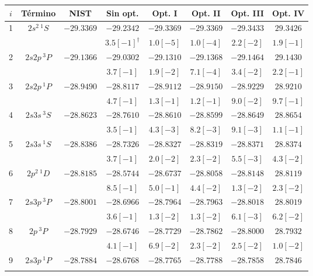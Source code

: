 \begin{table}
\centering
\begin{tabular}{|*{8}{c|}}
\hline 
$i$ & Término & NIST 
  & Sin opt.    & Opt. I     & Opt. II    & Opt. III   & Opt. IV \\
\hline \hline 
\rowcolor{mygray} 
1 & $2s^2\,^1S$ & $-29.3369$ 
  & $-29.2342$  & $-29.3369$ & $-29.3369$ & $-29.3433$ & $29.3426$ \\ & & 
  & $3.5[-1]^\dagger$ & $1.0[-5]$ & $1.0[-4]$ & $2.2[-2]$ & $1.9[-1]$ \\ 
\rowcolor{mygray} 
2 & $2s2p\,^3P$ & $-29.1366$ 
  & $-29.0302$  & $-29.1310$ & $-29.1368$ & $-29.1464$ & $29.1430$ \\ & & 
  & $3.7[-1]$   & $1.9[-2]$  & $7.1[-4]$  & $3.4[-2]$  & $2.2[-1]$ \\ 
\rowcolor{mygray} 
3 & $2s2p\,^1P$ & $-28.9490$ 
  & $-28.8117$  & $-28.9112$ & $-28.9150$ & $-28.9229$ & $28.9210$ \\ & & 
  & $4.7[-1]$   & $1.3[-1]$  & $1.2[-1]$  & $9.0[-2]$  & $9.7[-1]$ \\ 
\rowcolor{mygray}
4 & $2s3s\,^3S$ & $-28.8623$ 
  & $-28.7610$  & $-28.8610$ & $-28.8599$ & $-28.8649$ & $28.8654$ \\ & & 
  & $3.5[-1]$   & $4.3[-3]$  & $8.2[-3]$  & $9.1[-3]$  & $1.1[-1]$ \\ 
\rowcolor{mygray} 
5 & $2s3s\,^1S$ & $-28.8386$ 
  & $-28.7326$  & $-28.8327$ & $-28.8319$ & $-28.8371$ & $28.8374$ \\ & & 
  & $3.7[-1]$   & $2.0[-2]$  & $2.3[-2]$  & $5.5[-3]$  & $4.3[-2]$ \\ 
\rowcolor{mygray} 
6 & $2p^2\,^1D$ & $-28.8185$
  & $-28.5744$  & $-28.6737$ & $-28.8058$ & $-28.8148$ & $28.8119$ \\ & & 
  & $8.5[-1]$   & $5.0[-1]$  & $4.4[-2]$  & $1.3[-2]$  & $2.3[-2]$\\ 
\rowcolor{mygray} 
7 & $2s3p\,^3P$ & $-28.8001$ 
  & $-28.6966$  & $-28.7964$ & $-28.7963$ & $-28.8018$ & $28.8019$ \\ & & 
  & $3.6[-1]$   & $1.3[-2]$  & $1.3[-2]$  & $6.1[-3]$  & $6.2[-2]$ \\  
\rowcolor{mygray} 
8 & $2p\,^3P$   & $-28.7929$ 
  & $-28.6746$  & $-28.7729$ & $-28.7862$ & $-28.8000$ & $28.7932$ \\ & & 
  & $4.1[-1]$   & $6.9[-2]$  & $2.3[-2]$  & $2.5[-2]$  & $1.0[-2]$ \\  
\rowcolor{mygray} 
9 & $2s3p\,^1P$ & $-28.7884$ 
  & $-28.6768$  & $-28.7765$ & $-28.7788$ & $-28.7858$ & $28.7846$ \\ & & 

\end{tabular}
\end{table}
